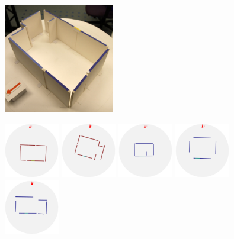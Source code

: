 \documentclass[review]{vgtc}                 %
\begin{document}




\begin{figure}[t]
\includegraphics[width=1.9in]{images/photos/63_original} %
\begin{minipage}[b]{4.9in}
  \includegraphics[width=0.95in]{images/section2/0_2D_walls_rotate} %
  \includegraphics[width=0.95in]{images/section2/2_2D_walls_rotate} %
  \includegraphics[width=0.95in]{images/section2/6_2D_walls_rotate}  %
  \includegraphics[width=0.95in]{images/section2/7_2D_walls_rotate} %
  \includegraphics[width=0.95in]{images/section2/8_2D_walls_rotate}\\ %

\end{minipage}
\end{figure}
\end{document}
